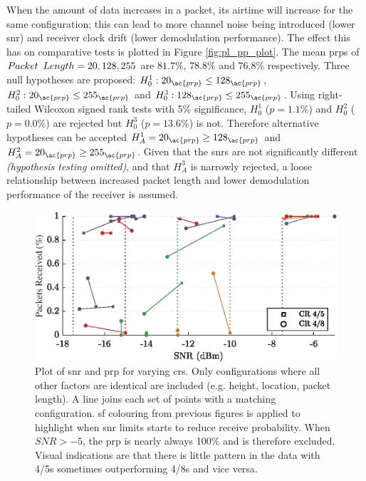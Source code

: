 When the amount of data increases in a packet, its airtime will increase for the same configuration; this can lead to more channel noise being introduced (lower \ac{snr}) and receiver clock drift (lower demodulation performance). The effect this has on comparative tests is plotted in Figure \ref{fig:pl_pp_plot}. The mean \ac{prp}s of $Packet\enskip Length = 20, 128, 255$ are $81.7\%$, $78.8\%$ and $76.8\%$ respectively.  Three null hypotheses are proposed: $H^1_{0} : 20_{\ac{prp}} \leq 128_{\ac{prp}}$, $H^2_{0} : 20_{\ac{prp}} \leq 255_{\ac{prp}}$ and $H^3_{0} : 128_{\ac{prp}} \leq 255_{\ac{prp}}$. Using right-tailed Wilcoxon signed rank tests with 5\% significance, $H^1_{0}$ ($p=1.1\%$) and $H^2_{0}$ ($p=0.0\%$) are rejected but $H^3_{0}$ ($p=13.6\%$) is not. Therefore alternative hypotheses can be accepted  $H^1_{A}=20_{\ac{prp}} \geq 128_{\ac{prp}}$ and $H^2_{A}=20_{\ac{prp}} \geq 255_{\ac{prp}}$. Given that the \ac{snr}s are not significantly different \textit{(hypothesis testing omitted)}, and that $H^3_{A}$ is narrowly rejected, a loose relationship between increased packet length and lower demodulation performance of the receiver is assumed.


\begin{figure}[H]
    \centering
   	\includegraphics{Figures/cr_pp_plot}
    \caption[Effect of Coding Rate on \ac{snr} and \ac{prp}]{
    Plot of \ac{snr} and \ac{prp} for varying \ac{cr}s. Only configurations where all other factors are identical are included (e.g. height, location, packet length). A line joins each set of points with a matching configuration. \ac{sf} colouring from previous figures is applied to highlight when \ac{snr} limits starts to reduce receive probability. When $SNR > -5$, the \ac{prp} is nearly always 100\% and is therefore excluded. Visual indications are that there is little pattern in the data with 4/5s sometimes outperforming 4/8s and vice versa.
    }
    \label{fig:cr_pp_plot}
\end{figure}

